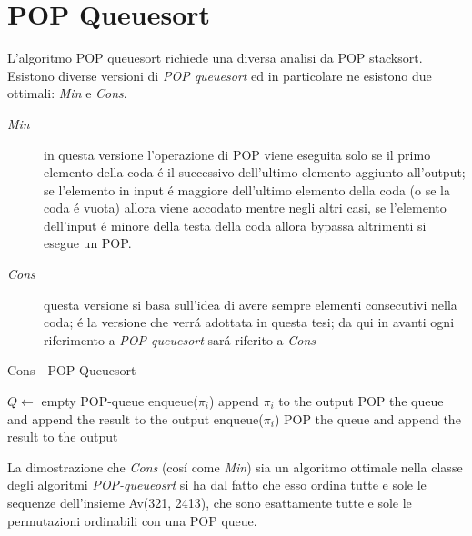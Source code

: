 \section*{POP Queuesort}L'algoritmo POP queuesort richiede una diversa analisi da POP stacksort.\\
Esistono diverse versioni di \textit{POP queuesort} ed in particolare ne esistono due ottimali\cite{cioni2021sorting}: \textit{Min} e \textit{Cons}.
\begin{description}
	\item[\textit{Min}] in questa versione l'operazione di POP viene eseguita solo se il primo elemento della coda \'e il successivo dell'ultimo elemento aggiunto all'output; se l'elemento in input \'e maggiore dell'ultimo elemento della coda (o se la coda \'e vuota) allora viene accodato mentre negli altri casi, se l'elemento dell'input \'e minore della testa della coda allora bypassa altrimenti si esegue un POP.
	\item[\textit{Cons}] questa versione si basa sull'idea di avere sempre elementi consecutivi nella coda; \'e la versione che verr\'a adottata in questa tesi; da qui in avanti ogni riferimento a \textit{POP-queuesort} sar\'a riferito a \textit{Cons}
\end{description}
\begin{algorithm}[H]
   \caption{Cons - POP Queuesort}
\begin{algorithmic}[1]
\State $Q\leftarrow$ empty POP-queue
		\State enqueue($\pi_i$)
	\Else
			\State append $\pi_i$ to the output
		\Else
			\State POP the queue and append the result to the output
			\State enqueue($\pi_i$)
		\EndIf
	\EndIf
\EndFor
\State POP the queue and append the result to the output
\end{algorithmic}
\end{algorithm}
La dimostrazione che \textit{Cons} (cos\'i come \textit{Min}) sia un algoritmo ottimale nella classe degli algoritmi \textit{POP-queueosrt} si ha dal fatto che esso ordina tutte e sole le sequenze dell'insieme Av(321, 2413), che sono esattamente tutte e sole le permutazioni ordinabili con una POP queue\cite{cioni2021sorting}.
